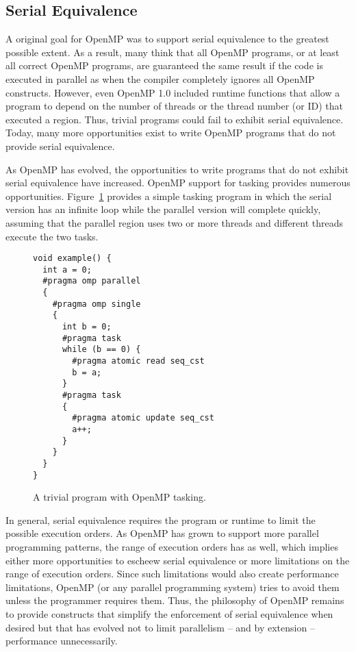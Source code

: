 \subsection{Serial Equivalence}
\label{sub:serial_equivalence}

A original goal for OpenMP was to support serial equivalence to the 
greatest possible extent. As a result, many think that all OpenMP programs, 
or at least all correct OpenMP programs, are guaranteed the same result
if the code is executed in parallel as when the compiler completely 
ignores all OpenMP constructs. However, even OpenMP 1.0 included runtime
functions that allow a program to depend on the number of threads or the
thread number (or ID) that executed a region. Thus, trivial programs could
fail to exhibit serial equivalence. Today, many more opportunities exist
to write OpenMP programs that do not provide serial equivalence. 


As OpenMP has evolved, the opportunities to write programs that do not
exhibit serial equivalence have increased. OpenMP support for tasking 
provides numerous opportunities. Figure~\ref{fig:trivial_task} provides
a simple tasking program in which the serial version has an infinite loop
while the parallel version will complete quickly, assuming that the parallel
region uses two or more threads and different threads execute the two tasks.

\begin{figure}
\begin{verbatim}
void example() {
  int a = 0;
  #pragma omp parallel
  {
    #pragma omp single
    {
      int b = 0;
      #pragma task
      while (b == 0) {
        #pragma atomic read seq_cst
        b = a;
      }
      #pragma task
      {
        #pragma atomic update seq_cst
        a++;
      }
    }
  }
}
\end{verbatim}
\caption{A trivial program with OpenMP tasking.\label{fig:trivial_task}}
\end{figure}


In general, serial equivalence requires the program or runtime to limit
the possible execution orders. As OpenMP has grown to support more parallel 
programming patterns, the range of execution orders has as well, which 
implies either more opportunities to escheew serial equivalence or more
limitations on the range of execution orders. Since such limitations would 
also create performance limitations, OpenMP (or any parallel programming 
system) tries to avoid them unless the programmer requires them. Thus, the 
philosophy of OpenMP remains to provide constructs that simplify the 
enforcement of serial equivalence when desired but that has evolved not 
to limit parallelism -- and by extension -- performance unnecessarily.

